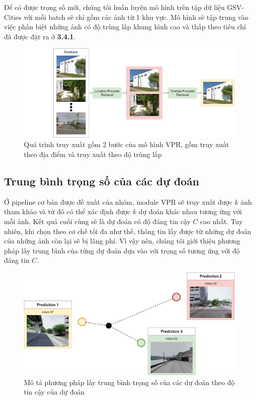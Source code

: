 Để có được trọng số mới, chúng tôi huấn luyện mô hình trên tập dữ liệu GSV-Cities \cite{Ali_bey_2022} với mỗi batch sẽ chỉ gồm các ảnh từ 1 khu vực. Mô hình sẽ tập trung vào việc phân biệt những ảnh có độ trùng lấp khung hình cao và thấp theo tiêu chí đã được đặt ra ở \textbf{3.4.1}.

\begin{figure}
  \centering
  \includegraphics[width=\textwidth]{pics/Proposal/rerank.drawio.png}
  \caption[Quá trình truy xuất 2 bước của VPR]{Quá trình truy xuất gồm 2 bước của mô hình VPR, gồm truy xuất theo địa điểm và truy xuất theo độ trùng lắp}
\end{figure}

\subsection{Trung bình trọng số của các dự đoán}

Ở pipeline cơ bản được đề xuất của nhóm, module VPR sẽ truy xuất được $k$ ảnh tham khảo và từ đó có thể xác định được $k$ dự đoán khác nhau tương ứng với mỗi ảnh. Kết quả cuối cùng sẽ là dự đoán có độ đáng tin cậy $C$ cao nhất. Tuy nhiên, khi chọn theo cơ chế tối đa như thế, thông tin lấy được từ những dự đoán của những ảnh còn lại sẽ bị lãng phí. Vì vậy nên, chúng tôi giới thiệu phương pháp lấy trung bình của từng dự đoán dựa vào với trọng số tương ứng với độ đáng tin $C$.

\begin{figure}[H]
  \centering
  \includegraphics[width=\textwidth]{pics/Proposal/weighted.png}
  \caption[Trung bình trọng số theo inlier của dự đoán]{Mô tả phương pháp lấy trung bình trọng số của các dự đoán theo độ tin cậy của dự đoán}
\end{figure}

